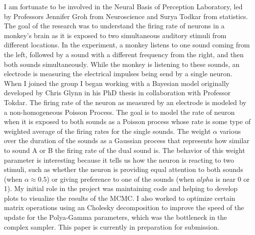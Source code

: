 \documentclass[12pt]{article}
\begin{document}
  I am fortunate to be involved in the Neural Basis of Perception Laboratory, led by Professors Jennifer Groh from Neuroscience and Surya Todkar from statistics.  The goal of the research was to understand the firing rate of neurons in a monkey's brain as it is exposed to two simultaneous auditory stimuli from different locations.  In the experiment, a monkey listens to one sound coming from the left, followed by a sound with a different frequency from the right, and then both sounds simultaneously.  While the monkey is listening to these sounds, an electrode is measuring the electrical impulses being send by a single neuron.  When I joined the group I began working with a Bayesian model originally developed by Chris Glynn in his PhD thesis in collaboration with Professor Tokdar.  The firing rate  of the neuron as measured by an electrode is modeled by a non-homogeneous Poisson Process.  The goal is to model the rate of neuron when it is exposed to both sounds as a Poisson process whose rate is some type of weighted average of the firing rates for the single sounds.   The weight $\alpha$ various over the duration of the sounds as a Gaussian process that represents how similar to sound A or B the firing rate of the dual sound is.  The behavior of this weight parameter is interesting because it tells us how the neuron is reacting to two stimuli, such as whether the neuron is providing equal attention to both sounds (when $\alpha \approx 0.5$) or giving preference to one of the sounds (when $alpha$ is near 0 or 1).  My initial role in the project was maintaining code and helping to develop plots to visualize the results of the MCMC.  I also worked to optimize certain matrix operations using an Cholesky decomposition to improve the speed of the update for the Polya-Gamma parameters, which was the bottleneck in the complex sampler.  This paper is currently in preparation for submission.  
  
\end{document}
